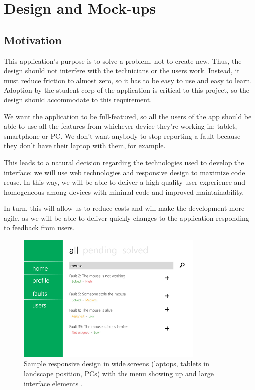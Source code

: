 \documentclass{report}
\begin{document}



\chapter{Design and Mock-ups}

\section{Motivation}

This application's purpose is to solve a problem, not to create new. Thus, the design should not interfere with the technicians or the users work. Instead, it must reduce friction to almost zero, so it has to be easy to use and easy to learn. Adoption by the student corp of the application is critical to this project, so the design should accommodate to this requirement.

We want the application to be full-featured, so all the users of the app should be able to use all the features from whichever device they're working in: tablet, smartphone or PC. We don't want anybody to stop reporting a fault because they don't have their laptop with them, for example.

This leads to a natural decision regarding the technologies used to develop the interface: we will use web technologies and responsive design to maximize code reuse. In this way, we will be able to deliver a high quality user experience and homogeneous among devices with minimal code and improved maintainability.

In turn, this will allow us to reduce costs and will make the development more agile, as we will be able to deliver quickly changes to the application responding to feedback from users.


\begin{figure}[hbtp]
\centering
\includegraphics[width=0.8\textwidth]{img/WideScreens.png}
\caption{Sample responsive design in wide screens (laptops, tablets in landscape position, PCs) with the menu showing up and large interface elements .}
\label{imgWideScreens}
\end{figure}
\end{document}
